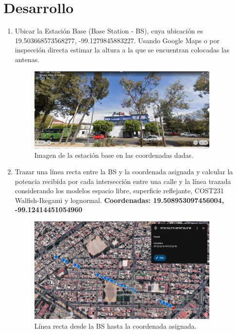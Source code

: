 \section{\Large Desarrollo}

\begin{enumerate}
	\subsection{Obteniendo los datos.}
	\item Ubicar la Estación Base (Base Station - BS), cuya ubicación es 19.503668573568277, -99.1279845883227. Usando Google Maps o por inspección directa estimar la altura a la que se encuentran colocadas las antenas.
	      \begin{figure}[H]
		      \centering
		      \includegraphics[width=0.9\textwidth]{./img/bs.png}
		      \caption{Imagen de la estación base en las coordenadas dadas.}
		      \label{fig:bs}
	      \end{figure}
	\item Trazar una línea recta entre la BS y la coordenada asignada y calcular la potencia recibida por cada intersección entre una calle y la línea trazada considerando los modelos espacio libre, superficie reflejante, COST231 Walfish-Ikegami y lognormal.
	      \textbf{Coordenadas: 19.508953097456004, -99.12414451054960}
	      \begin{figure}[H]
		      \centering
		      \includegraphics[width=0.9\textwidth]{./img/coordenada-dada.png} %
		      \caption{Línea recta desde la BS hasta la coordenada asignada.}
		      \label{fig:coordenada-dada}
	      \end{figure}


\end{enumerate}
